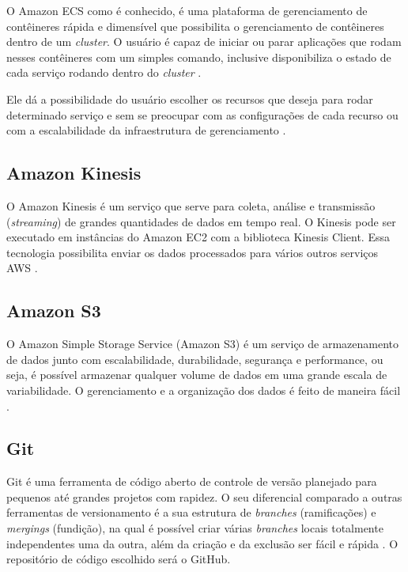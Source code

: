 O Amazon ECS como é conhecido, é uma plataforma de gerenciamento de contêineres rápida e dimensível que possibilita o gerenciamento de contêineres dentro de um \textit{cluster}. O usuário é capaz de iniciar ou parar aplicações que rodam nesses contêineres com um simples comando, inclusive disponibiliza o estado de cada serviço rodando dentro do \textit{cluster} \cite{amazonECS:2019}.

Ele dá a possibilidade do usuário escolher os recursos que deseja para rodar determinado serviço e sem se preocupar com as configurações de cada recurso ou com a escalabilidade da infraestrutura de gerenciamento \cite{amazonECS:2019}.

\subsection{Amazon Kinesis}

O Amazon Kinesis é um serviço que serve para coleta, análise e transmissão (\textit{streaming}) de grandes quantidades de dados em tempo real. O Kinesis pode ser executado em instâncias do Amazon EC2 com a biblioteca Kinesis Client. Essa tecnologia possibilita enviar os dados processados para vários outros serviços AWS \cite{KINESIS:2019}.

\subsection{Amazon S3}

O  Amazon Simple Storage Service (Amazon S3) é um serviço de armazenamento de dados junto com escalabilidade, durabilidade, segurança e performance, ou seja, é possível armazenar qualquer volume de dados em uma grande escala de variabilidade. O gerenciamento e a organização dos dados é feito de maneira fácil \cite{S3:2019}.

\subsection{Git}

Git é uma ferramenta de código aberto de controle de versão planejado para pequenos até grandes projetos com rapidez. O seu diferencial comparado a outras ferramentas de versionamento é a sua estrutura de \textit{branches} (ramificações) e \textit{mergings} (fundição), na qual é possível criar várias \textit{branches} locais totalmente independentes uma da outra, além da criação e da exclusão ser fácil e rápida \cite{git:2019}. O repositório de código escolhido será o GitHub.

